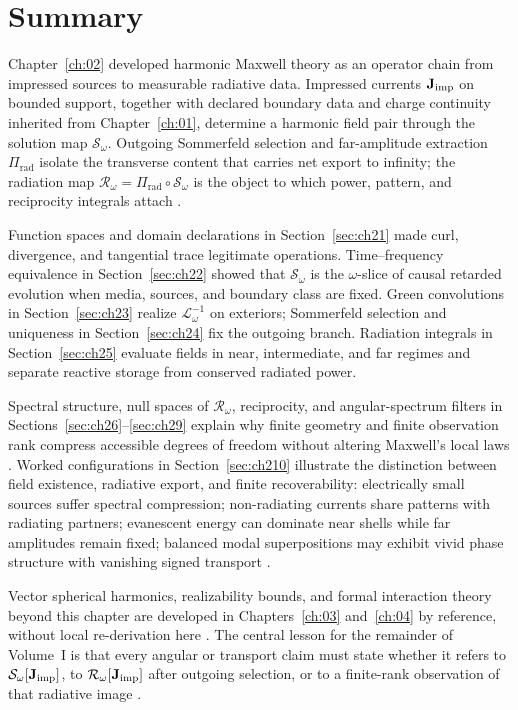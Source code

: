 \section{Summary}
\label{sec:ch02.11}

Chapter~\ref{ch:02} developed harmonic Maxwell theory as an operator chain from impressed sources
to measurable radiative data. Impressed currents $\mathbf{J}_{\mathrm{imp}}$ on bounded support, together with
declared boundary data and charge continuity inherited from Chapter~\ref{ch:01}, determine a
harmonic field pair through the solution map $\mathcal{S}_\omega$. Outgoing Sommerfeld
selection and far-amplitude extraction $\Pi_{\mathrm{rad}}$ isolate the transverse content
that carries net export to infinity; the radiation map
$\mathcal{R}_\omega=\Pi_{\mathrm{rad}}\circ\mathcal{S}_\omega$ is the object to which power,
pattern, and reciprocity integrals attach \cite{maxwell1873,stratton1941,sommerfeld1949}.

Function spaces and domain declarations in Section~\ref{sec:ch21} made curl, divergence, and
tangential trace legitimate operations. Time--frequency equivalence in Section~\ref{sec:ch22}
showed that $\mathcal{S}_\omega$ is the $\omega$-slice of causal retarded evolution when media,
sources, and boundary class are fixed. Green convolutions in Section~\ref{sec:ch23} realize
$\mathcal{L}_\omega^{-1}$ on exteriors; Sommerfeld selection and uniqueness in Section~\ref{sec:ch24}
fix the outgoing branch. Radiation integrals in Section~\ref{sec:ch25} evaluate fields in near,
intermediate, and far regimes and separate reactive storage from conserved radiated power.

Spectral structure, null spaces of $\mathcal{R}_\omega$, reciprocity, and angular-spectrum
filters in Sections~\ref{sec:ch26}--\ref{sec:ch29} explain why finite geometry and finite
observation rank compress accessible degrees of freedom without altering Maxwell's local laws
\cite{chu1948,devaney2004,harrington2001}. Worked configurations in Section~\ref{sec:ch210}
illustrate the distinction between field existence, radiative export, and finite recoverability:
electrically small sources suffer spectral compression; non-radiating currents share patterns with
radiating partners; evanescent energy can dominate near shells while far amplitudes remain fixed;
balanced modal superpositions may exhibit vivid phase structure with vanishing signed transport
\cite{stratton1941}.

Vector spherical harmonics, realizability bounds, and formal interaction theory beyond this
chapter are developed in Chapters~\ref{ch:03} and~\ref{ch:04} by reference, without local
re-derivation here \cite{harrington2001}. The central lesson for the remainder of Volume~I is
that every angular or transport claim must state whether it refers to $\mathcal{S}_\omega[\mathbf{J}_{\mathrm{imp}}]$,
to $\mathcal{R}_\omega[\mathbf{J}_{\mathrm{imp}}]$ after outgoing selection, or to a finite-rank observation of
that radiative image \cite{stratton1941}.